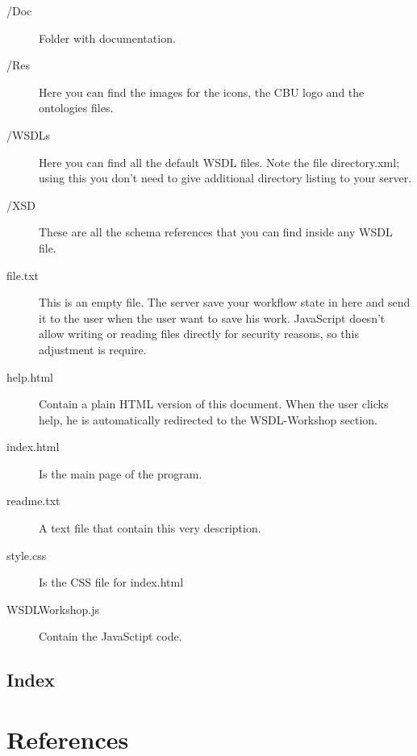 \documentclass[a4paper,10pt]{article}
\begin{document}
  \begin{description}
  \item[/Doc] Folder with documentation.
  \item[/Res] Here you can find the images for the icons, the CBU logo and the ontologies files.
  \item[/WSDLs] Here you can find all the default WSDL files. Note the file directory.xml; using this you don't need to give additional directory listing to your server.
  \item[/XSD] These are all the schema references that you can find inside any WSDL file.
  \item[file.txt] This is an empty file. The server save your workflow state in here and send it to the user when the user want to save his work. JavaScript doesn't allow writing or reading files directly for security reasons, so this adjustment is require.
  \item[help.html] Contain a plain HTML version of this document. When the user clicks help, he is automatically redirected to the WSDL-Workshop section.
  \item[index.html] Is the main page of the program.
  \item[readme.txt] A text file that contain this very description.
  \item[style.css] Is the CSS file for index.html
  \item[WSDLWorkshop.js] Contain the JavaSctipt code.
  \end{description}

\subsection{Index}
  \printindex

  \newpage

\section{References}

  
  
\end{document}
